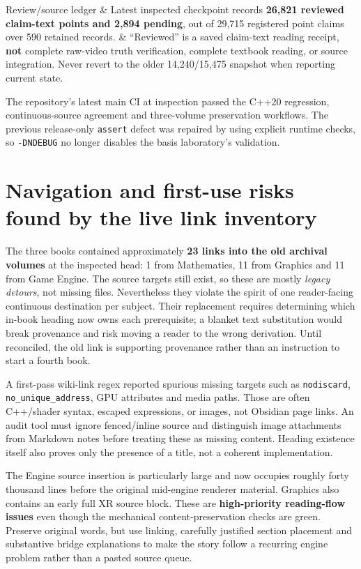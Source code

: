 {\begin{longtable}[]
Review/source ledger & Latest inspected checkpoint records \textbf{26,821 reviewed claim-text points and 2,894 pending}, out of 29,715 registered point claims over 590 retained records. & ``Reviewed'' is a saved claim-text reading receipt, \textbf{not} complete raw-video truth verification, complete textbook reading, or source integration. Never revert to the older 14,240/15,475 snapshot when reporting current state. \\
\end{longtable}
}

The repository's latest main CI at inspection passed the C++20 regression, continuous-source agreement and three-volume preservation workflows. The previous release-only \texttt{assert} defect was repaired by using explicit runtime checks, so \texttt{-DNDEBUG} no longer disables the basis laboratory's validation.

\section{Navigation and first-use risks found by the live link inventory}\label{appendix-28e6f216fdc7-navigation-and-first-use-risks-found-by-the-live-link-inventory}

The three books contained approximately \textbf{23 links into the old archival volumes} at the inspected head: 1 from Mathematics, 11 from Graphics and 11 from Game Engine. The source targets still exist, so these are mostly \emph{legacy detours}, not missing files. Nevertheless they violate the spirit of one reader-facing continuous destination per subject. Their replacement requires determining which in-book heading now owns each prerequisite; a blanket text substitution would break provenance and risk moving a reader to the wrong derivation. Until reconciled, the old link is supporting provenance rather than an instruction to start a fourth book.

A first-pass wiki-link regex reported spurious missing targets such as \texttt{nodiscard}, \texttt{no\_unique\_address}, GPU attributes and media paths. Those are often C++/shader syntax, escaped expressions, or images, not Obsidian page links. An audit tool must ignore fenced/inline source and distinguish image attachments from Markdown notes before treating these as missing content. Heading existence itself also proves only the presence of a title, not a coherent implementation.

The Engine source insertion is particularly large and now occupies roughly forty thousand lines before the original mid-engine renderer material. Graphics also contains an early full XR source block. These are \textbf{high-priority reading-flow issues} even though the mechanical content-preservation checks are green. Preserve original words, but use linking, carefully justified section placement and substantive bridge explanations to make the story follow a recurring engine problem rather than a pasted source queue.

